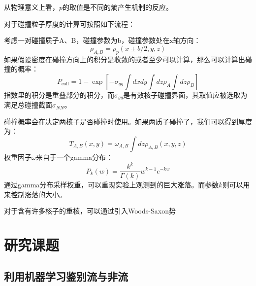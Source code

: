 \documentclass[aps,pre,12pt,preprint,onecolumn,showpacs,showkeys]{revtex4-1}
\begin{document}
从物理意义上看，$p$的取值是不同的熵产生机制的反应。\par
对于碰撞粒子厚度的计算可按照如下流程：\par
考虑一对碰撞质子A、B，碰撞参数为b，碰撞参数处在x轴方向：
\begin{equation}
    \rho_{A,B}=\rho_{p}(x\pm b/2,y,z)
\end{equation}
如果假设密度在碰撞方向上的积分是收敛的或者至少可以计算，那么可以计算出碰撞的概率：
\begin{equation}
    P_{\mathrm{coll}}=1-\exp \left[-\sigma_{g g} \int d x d y \int d z \rho_{A} \int d z \rho_{B}\right]
\end{equation}
指数里的积分是重叠部分的积分，而$\sigma_{gg}$是有效核子碰撞界面，其取值应被选取为满足总碰撞截面$\sigma_{NN}$。
\par
碰撞概率会在决定两核子是否碰撞时使用。如果两质子碰撞了，我们可以得到厚度为：
\begin{equation}
    T_{A,B}(x,y)=\omega_{A,B}\int dz \rho_{A,B}(x,y,z)
\end{equation}
权重因子$\omega$来自于一个gamma分布：
\begin{equation}
    P_{k}(w)=\frac{k^{k}}{\Gamma(k)} w^{k-1} e^{-k w}
\end{equation}
通过gamma分布采样权重，可以重现实验上观测到的巨大涨落。而参数$k$则可以用来控制涨落的大小。\par
对于含有许多核子的重核，可以通过引入Woods-Saxon势
\section{研究课题}
\subsection{利用机器学习鉴别流与非流}
\end{document}

